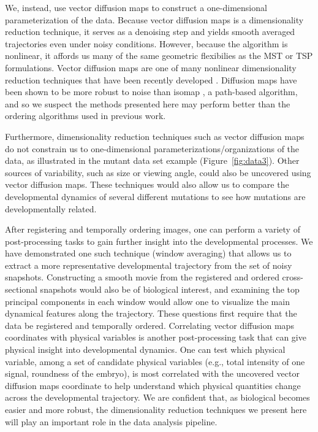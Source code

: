 \documentclass{pnastwo}
\begin{document}
\begin{article}
We, instead, use vector diffusion maps to construct a one-dimensional parameterization of the data.
%
Because vector diffusion maps is a dimensionality reduction technique, it serves as a denoising step and yields smooth averaged trajectories even under noisy conditions. 
%
However, because the algorithm is nonlinear, it affords us many of the same geometric flexibilies as the MST or TSP formulations. 
%
Vector diffusion maps are one of many nonlinear dimensionality reduction techniques that have been recently developed \cite{Belkin2003, tenenbaum2000global, Donoho2003, Roweis2000}.
%
Diffusion maps have been shown to be more robust to noise than isomap \cite{balasubramanian2002isomap}, a path-based algorithm, and so we suspect the methods presented here may perform better than the ordering algorithms used in previous work.

Furthermore, dimensionality reduction techniques such as vector diffusion maps do not constrain us to one-dimensional parameterizations/organizations of the data, as illustrated in the mutant data set example (Figure~\ref{fig:data3}).
%
Other sources of variability, such as size or viewing angle, could also be uncovered using vector diffusion maps.
%
These techniques would also allow us to compare the developmental dynamics of several different mutations to see how mutations are developmentally related. 

After registering and temporally ordering images, one can perform a variety of post-processing tasks to gain further insight into the developmental processes.
%
We have demonstrated one such technique (window averaging) that allows us to extract a more representative developmental trajectory from the set of noisy snapshots. 
%
Constructing a smooth movie from the registered and ordered cross-sectional snapshots would also be of biological interest, and
examining the top principal components in each window would allow one to visualize the main dynamical features along the trajectory.
%
These questions first require that the data be registered and temporally ordered.
%
Correlating vector diffusion maps coordinates with physical variables is another post-processing task that can give physical insight into developmental dynamics.
%
One can test which physical variable, among a set of candidate physical variables (e.g., total intensity of one signal, roundness of the embryo), is most correlated with the uncovered vector diffusion maps coordinate to help understand which physical quantities change across the developmental trajectory.
%
We are confident that, as biological becomes easier and more robust, the dimensionality reduction techniques we present here will play an important role in the data analysis pipeline. 



\end{article}
\end{document}
